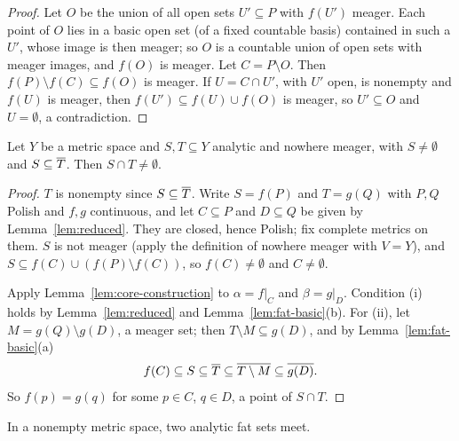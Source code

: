 \begin{proof}
Let $O$ be the union of all open sets $U'\subseteq P$ with $f(U')$ meager. Each point of $O$ lies in a
basic open set (of a fixed countable basis) contained in such a $U'$, whose image is then meager;
so $O$ is a countable union of open sets with meager images, and $f(O)$ is meager. Let $C=P\setminus
O$. Then $f(P)\setminus f(C)\subseteq f(O)$ is meager. If $U=C\cap U'$, with $U'$ open, is nonempty and
$f(U)$ is meager, then $f(U')\subseteq f(U)\cup f(O)$ is meager, so $U'\subseteq O$ and $U=\emptyset$, a
contradiction.
\end{proof}


\begin{theorem}\label{thm:prop22}
Let $Y$ be a metric space and $S,T\subseteq Y$ analytic and nowhere meager, with $S\neq\emptyset$ and
$S\subseteq\overline{T}$. Then $S\cap T\neq\emptyset$.
\end{theorem}

\begin{proof}
$T$ is nonempty since $S\subseteq\overline{T}$. Write $S=f(P)$ and $T=g(Q)$ with $P,Q$ Polish and $f,g$ continuous,
and let $C\subseteq P$ and $D\subseteq Q$ be given by Lemma~\ref{lem:reduced}. They are closed, hence Polish;
fix complete metrics on them. $S$ is not meager (apply the definition of nowhere meager with
$V=Y$), and $S\subseteq f(C)\cup(f(P)\setminus f(C))$, so $f(C)\ne\emptyset$ and $C\ne\emptyset$.

Apply Lemma~\ref{lem:core-construction} to $\alpha=f|_C$ and $\beta=g|_D$. Condition (i) holds by
Lemma~\ref{lem:reduced} and Lemma~\ref{lem:fat-basic}(b). For (ii), let $M=g(Q)\setminus g(D)$, a meager
set; then $T\setminus M\subseteq g(D)$, and by Lemma~\ref{lem:fat-basic}(a)
\[
f(C)\subseteq S\subseteq\overline{T}\subseteq\overline{T\setminus M}\subseteq\overline{g(D)} .
\]
So $f(p)=g(q)$ for some $p\in C$, $q\in D$, a point of $S\cap T$.
\end{proof}


\begin{corollary}\label{cor:fat-meet}
In a nonempty metric space, two analytic fat sets meet.
\end{corollary}


